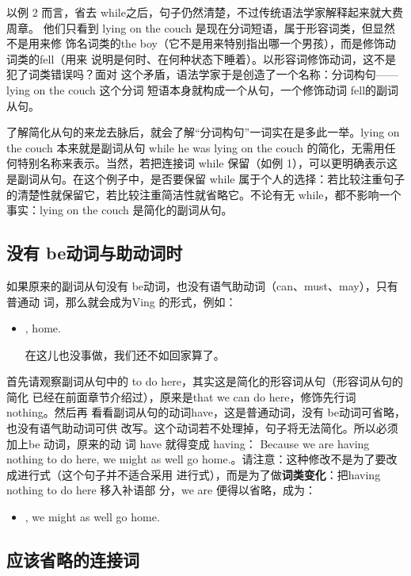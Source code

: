 以例 2 而言，省去 while之后，句子仍然清楚，不过传统语法学家解释起来就大费周章。
他们只看到 lying on the couch 是现在分词短语，属于形容词类，但显然不是用来修
饰名词类的the boy（它不是用来特别指出哪一个男孩），而是修饰动词类的fell（用来
说明是何时、在何种状态下睡着）。以形容词修饰动词，这不是犯了词类错误吗？面对
这个矛盾，语法学家于是创造了一个名称：分词构句——lying on the couch 这个分词
短语本身就构成一个从句，一个修饰动词 fell的副词从句。

了解简化从句的来龙去脉后，就会了解“分词构句”一词实在是多此一举。lying
on the couch 本来就是副词从句 while he was lying on the couch
的简化，无需用任何特别名称来表示。当然，若把连接词 while 保留（如例
1），可以更明确表示这是副词从句。在这个例子中，是否要保留 while
属于个人的选择：若比较注重句子的清楚性就保留它，若比较注重简洁性就省略它。不论有无
while，都不影响一个事实：lying on the couch 是简化的副词从句。

\subsection{没有 be动词与助动词时}

如果原来的副词从句没有 be动词，也没有语气助动词（can、must、may），只有普通动
词，那么就会成为Ving 的形式，例如：
\begin{itemize}
\item {}, 
   home.

  在这儿也没事做，我们还不如回家算了。
\end{itemize}
首先请观察副词从句中的 to do here，其实这是简化的形容词从句（形容词从句的简化
已经在前面章节介绍过），原来是that we can do here，修饰先行词 nothing。然后再
看看副词从句的动词have，这是普通动词，没有 be动词可省略，也没有语气助动词可供
改写。这个动词若不处理掉，句子将无法简化。所以必须加上be 动词，原来的动
词 have 就得变成 having： Because we are having nothing to do here, we might
as well go home.。请注意：这种修改不是为了要改成进行式（这个句子并不适合采用
进行式），而是为了做\textbf{词类变化}：把having nothing to do here 移入补语部
分，we are 便得以省略，成为：
\begin{itemize}
\item {}, we might as well go home.
\end{itemize}

\subsection{应该省略的连接词}

